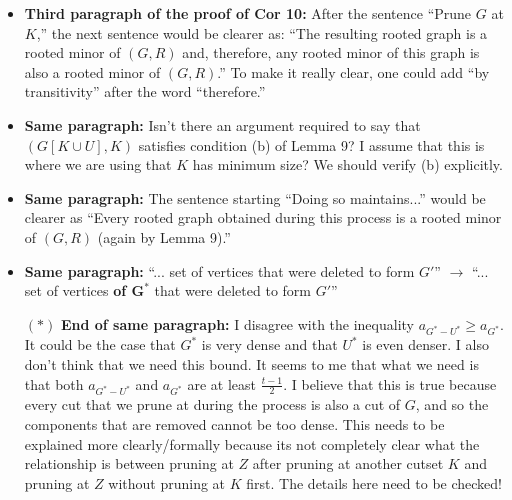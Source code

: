 \documentclass[11 pt]{article}
\begin{document}
\begin{itemize}
\item \textbf{Third paragraph of the proof of Cor 10:} After the sentence ``Prune $G$ at $K$,'' the next sentence would be clearer as: ``The resulting rooted graph is a rooted minor of $(G,R)$ and, therefore, any rooted minor of this graph is also a rooted minor of $(G,R)$.'' To make it really clear, one could add ``by transitivity'' after the word ``therefore.''
\item \textbf{Same paragraph:} Isn't there an argument required to say that $(G[K\cup U],K)$ satisfies condition (b) of Lemma 9? I assume that this is where we are using that $K$ has minimum size? We should verify (b) explicitly. 
\item \textbf{Same paragraph:} The sentence starting ``Doing so maintains...'' would be clearer as ``Every rooted graph obtained during this process is a rooted minor of $(G,R)$ (again by Lemma 9).''
\item \textbf{Same paragraph:} ``... set of vertices that were deleted to form $G'$'' $\to$ ``... set of vertices \textbf{of $\boldsymbol{G^*}$} that were deleted to form $G'$''
\item[$\boldsymbol{(*)}$] \textbf{End of same paragraph:} I disagree with the inequality $a_{G^*-U^*}\geq a_{G^*}$. It could be the case that $G^*$ is very dense and that $U^*$ is even denser. I also don't think that we need this bound. It seems to me that what we need is that both $a_{G^*-U^*}$ and $a_{G^*}$ are at least $\frac{t-1}{2}$. I believe that this is true because every cut that we prune at during the process is also a cut of $G$, and so the components that are removed cannot be too dense. This needs to be explained more clearly/formally because its not completely clear what the relationship is between pruning at $Z$ after pruning at another cutset $K$ and pruning at $Z$ without pruning at $K$ first. The details here need to be checked!


\end{itemize}
\end{document}
